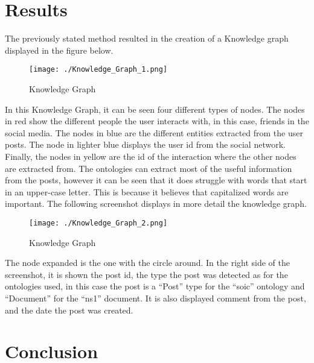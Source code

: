 \documentclass[conference]{IEEEtran}
\begin{document}
\section{Results}
The previously stated method resulted in the creation of a Knowledge graph displayed in the figure below. 

\begin{figure}[H]
\centerline{\texttt{[image: ./Knowledge\_Graph\_1.png]}}
\caption{Knowledge Graph}
\label{fig1}
\end{figure}

In this Knowledge Graph, it can be seen four different types of nodes. The nodes in red show the different people the user interacts with, in this case, friends in the social media. The nodes in blue are the different entities extracted from the user posts. The node in lighter blue displays the user id from the social network. Finally, the nodes in yellow are the id of the interaction where the other nodes are extracted from. The ontologies can extract most of the useful information from the posts, however it can be seen that it does struggle with words that start in an upper-case letter. This is because it believes that capitalized words are important.
	The following screenshot displays in more detail the knowledge graph. 

\begin{figure}[H]
\centerline{\texttt{[image: ./Knowledge\_Graph\_2.png]}}
\caption{Knowledge Graph}
\label{fig2}
\end{figure}

The node expanded is the one with the circle around. In the right side of the screenshot, it is shown the post id, the type the post was detected as for the ontologies used, in this case the post is a “Post” type for the “soic” ontology and “Document” for the “ns1” document. It is also displayed comment from the post, and the date the post was created. 

\section{Conclusion}
\end{document}
